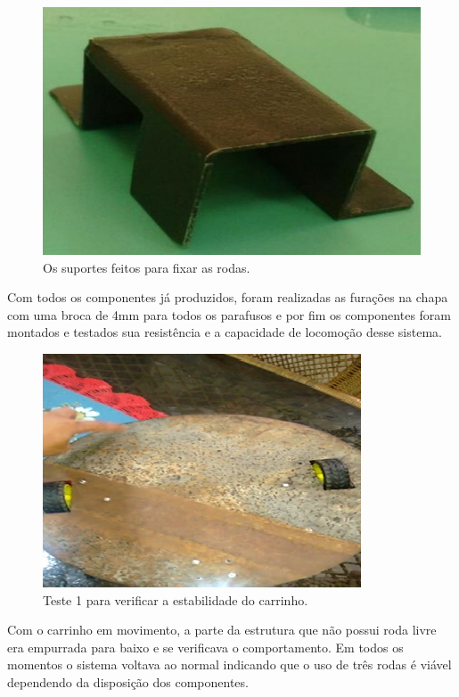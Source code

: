 \begin{figure}[H]
	\centering
	\includegraphics[scale=0.3]{figuras/suporte_fixar_rodas.png}
	\caption{Os suportes feitos para fixar as rodas.}
	\label{img:suporte_fixar_rodas}
\end{figure}

Com todos os componentes já produzidos, foram realizadas as furações na chapa com uma broca de 4mm para todos os parafusos e por fim os componentes foram montados e testados sua resistência e a capacidade de locomoção desse sistema. 

\begin{figure}[H]
	\centering
	\includegraphics[scale=1]{figuras/base_teste.png}
	\caption{Teste 1 para verificar a estabilidade do carrinho.}
	\label{img:base_teste}
\end{figure}

Com o carrinho em movimento, a parte da estrutura que não possui roda livre era empurrada para baixo e se verificava o comportamento. Em todos os momentos o sistema voltava ao normal indicando que o uso de três rodas é viável dependendo da disposição dos componentes.

